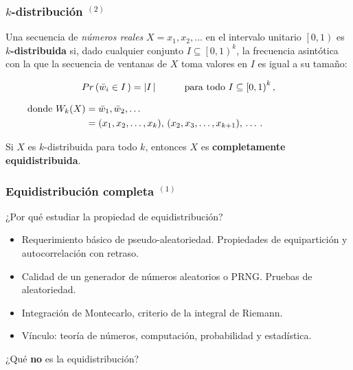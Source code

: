 \documentclass[t, 10pt, mathserif]{beamer}
\begin{document}
\begin{frame}
  \frametitle{$k$-distribución {$^{(2)}$}}

  Una secuencia de \textit{números reales} $X = x_1, x_2, \dots$ en el intervalo unitario $\left[0, 1\right)$ es \textbf{$k$-distribuida} si, dado cualquier conjunto $I \subseteq \left[0, 1\right)^k$, la frecuencia asintótica con la que la secuencia de ventanas de $X$ toma valores en $I$ es igual a su tamaño:
  \pause

  \begin{equation*}
    \begin{aligned}
      Pr \left( \bar{w}_i \in I\, \right) = \left| I\, \right| \hspace*{1cm} \text{para todo } I \subseteq \left[0, 1\right)^k \text{,}
    \end{aligned}
  \end{equation*}
  \pause

  \vspace{-0.5cm}
  \begin{equation*}
    \hspace{-2.5cm}
    \begin{aligned}
        \text{donde } W_k(X) =\; & \bar{w}_1, \bar{w}_2, \dots \\
                              =\; & (x_1, x_2, \dots, x_k      ),\, (x_2, x_3, \dots, x_{k + 1}),\, \dots \, \text{.}
    \end{aligned}
  \end{equation*}
  \vspace{-0.3cm}
  \pause

  Si $X$ es $k$-distribuida para todo $k$, entonces $X$ es \textbf{completamente equidistribuida}.
\end{frame}


\begin{frame}
  \frametitle{Equidistribución completa {$^{(1)}$}}

  ¿Por qué estudiar la propiedad de equidistribución?

  \begin{itemize}
    \item Requerimiento básico de pseudo-aleatoriedad. Propiedades de equipartición y autocorrelación con retraso. \pause
    \item Calidad de un generador de números aleatorios o PRNG. Pruebas de aleatoriedad.\pause %
    \item Integración de Montecarlo, criterio de la integral de Riemann. \pause
    \item Vínculo: teoría de números, computación, probabilidad y estadística.
  \end{itemize}
  \pause

  ¿Qué \textbf{no} es la equidistribución?
\end{frame}
 
\end{document}
